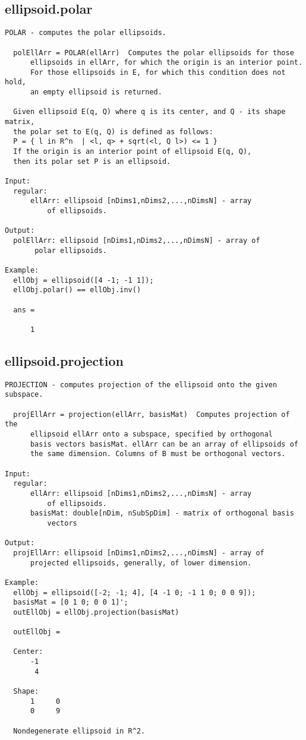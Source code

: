 \subsection{\texorpdfstring{ellipsoid.polar}{polar}}\label{method:ellipsoid.polar}
\begin{verbatim}
POLAR - computes the polar ellipsoids.

  polEllArr = POLAR(ellArr)  Computes the polar ellipsoids for those
      ellipsoids in ellArr, for which the origin is an interior point.
      For those ellipsoids in E, for which this condition does not hold,
      an empty ellipsoid is returned.

  Given ellipsoid E(q, Q) where q is its center, and Q - its shape matrix,
  the polar set to E(q, Q) is defined as follows:
  P = { l in R^n  | <l, q> + sqrt(<l, Q l>) <= 1 }
  If the origin is an interior point of ellipsoid E(q, Q),
  then its polar set P is an ellipsoid.

Input:
  regular:
      ellArr: ellipsoid [nDims1,nDims2,...,nDimsN] - array
          of ellipsoids.

Output:
  polEllArr: ellipsoid [nDims1,nDims2,...,nDimsN] - array of
       polar ellipsoids.

Example:
  ellObj = ellipsoid([4 -1; -1 1]);
  ellObj.polar() == ellObj.inv()

  ans =

      1
\end{verbatim}
\subsection{\texorpdfstring{ellipsoid.projection}{projection}}\label{method:ellipsoid.projection}
\begin{verbatim}
PROJECTION - computes projection of the ellipsoid onto the given subspace.

  projEllArr = projection(ellArr, basisMat)  Computes projection of the
      ellipsoid ellArr onto a subspace, specified by orthogonal
      basis vectors basisMat. ellArr can be an array of ellipsoids of
      the same dimension. Columns of B must be orthogonal vectors.

Input:
  regular:
      ellArr: ellipsoid [nDims1,nDims2,...,nDimsN] - array
          of ellipsoids.
      basisMat: double[nDim, nSubSpDim] - matrix of orthogonal basis
          vectors

Output:
  projEllArr: ellipsoid [nDims1,nDims2,...,nDimsN] - array of
      projected ellipsoids, generally, of lower dimension.

Example:
  ellObj = ellipsoid([-2; -1; 4], [4 -1 0; -1 1 0; 0 0 9]);
  basisMat = [0 1 0; 0 0 1]';
  outEllObj = ellObj.projection(basisMat)

  outEllObj =

  Center:
      -1
       4

  Shape:
      1     0
      0     9

  Nondegenerate ellipsoid in R^2.
\end{verbatim}
